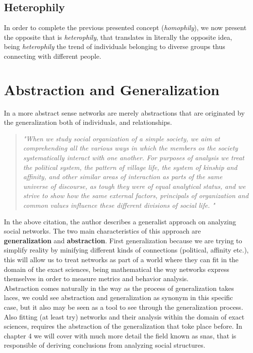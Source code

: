 \subsection*{Heterophily}

In order to complete the previous presented concept (\textit{homophily}), we now present the opposite that is \textit{heterophily}, that translates in literally the opposite idea, being \textit{heterophily} the trend of individuals belonging to diverse groups thus connecting with different people.


\section{Abstraction and Generalization}

In a more abstract sense networks are merely abstractions that are originated by the generalization both of individuals, and relationships.\\

\begin{quote}
\textit{"When we study social organization of a simple society, we aim at comprehending all the various ways in which the members os the society systematically interact with one another. For purposes of analysis we treat the political system, the pattern of village life, the system of kinship and affinity, and other similar areas of interaction as parts of the same universe of discourse, as tough they were of equal analytical status, and we strive to show how the same external factors, principals of organization and common values influence these different divisions of social life.
"}
\citep{barnes1954class}
\end{quote}

\indent In the above citation, the author describes a generalist approach on analyzing social networks. The two main characteristics of this approach are \textbf{generalization} and \textbf{abstraction}. First generalization because we are trying to simplify reality by minifying different kinds of connections (political, affinity etc.), this will allow us to treat networks as part of a world where they can fit in the domain of the exact sciences, being mathematical the way networks express themselves in order to measure metrics and behavior analysis.\\
\indent Abstraction comes naturally in the way as the process of generalization takes laces, we could see abstraction and generalization as synonym in this specific case, but it also may be seen as a tool to see through the generalization process. Also fitting (at least try) networks and their analysis within the domain of exact sciences, requires the abstraction of the generalization that toke place before. In chapter 4 we will cover with much more detail the field known as \glspl{sna}, that is responsible of deriving conclusions from analyzing social structures.
